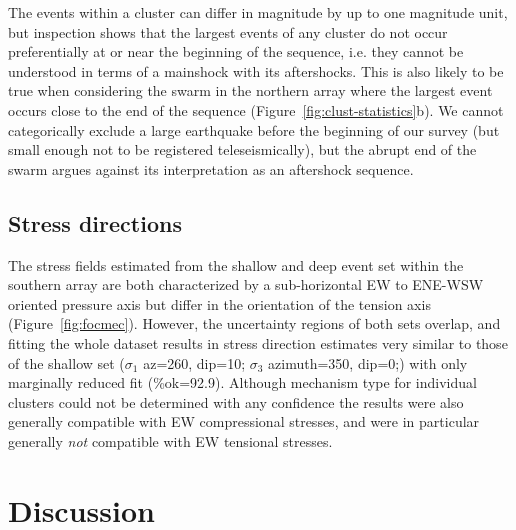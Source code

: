 \documentclass[reviewcopy]{elsart}
\begin{document}
The events within a cluster can differ in
magnitude by up to one magnitude unit,
 but inspection shows that the
largest events of any cluster do not occur preferentially at or near
the beginning of the sequence, i.e. they
cannot be understood in terms of a mainshock with its aftershocks.
This is also likely to be true when considering the swarm in the
northern array where the largest event occurs close to the end of the
sequence (Figure~\ref{fig:clust-statistics}b).  We cannot categorically exclude a large earthquake before
the beginning of our survey (but small enough not to be registered
teleseismically), but the abrupt end of the swarm argues against its
interpretation as an aftershock sequence.

\subsection{Stress directions}

The stress fields estimated from the shallow and deep event set within
the southern array are both characterized by a sub-horizontal EW to
ENE-WSW oriented pressure axis but differ in the orientation of the
tension axis (Figure~\ref{fig:focmec}). However, the uncertainty
regions of both sets overlap, and fitting the whole dataset results in
stress direction estimates very similar to those of the shallow set
($\sigma_1$ az=260\dg, dip=10\dg; $\sigma_3$ azimuth=350\dg, dip=0\dg;) with only marginally reduced fit
(\%ok=92.9).  Although  mechanism type for individual clusters
could not be determined with any confidence the results were
also generally compatible with EW compressional stresses, and were in
particular generally {\em not} compatible with EW tensional stresses.

\section{Discussion}
\end{document}
